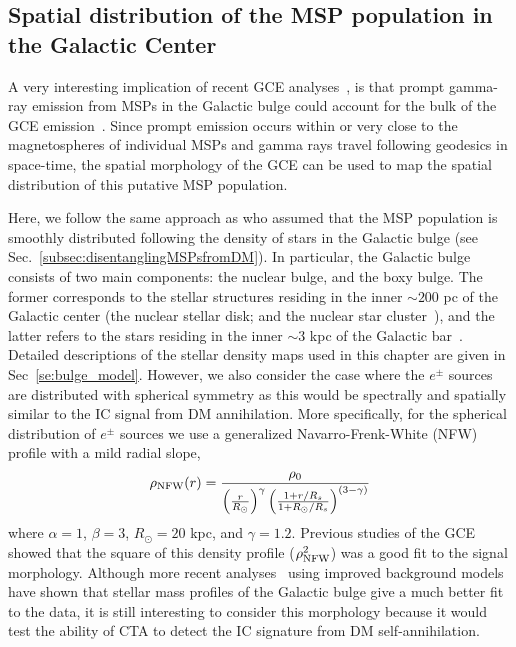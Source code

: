 \documentclass[doublespace,nopageskip]{VTthesis} %
\begin{document}
\subsection{Spatial distribution of the MSP population in the Galactic Center}
\label{subsec:spatialdistribution}

A very interesting implication of recent GCE analyses~\citep{Macias:2016nev,Bartels:2017vsx,Macias:2019omb,Abazajian:2020tww}, is that prompt gamma-ray emission from MSPs in the Galactic bulge could account for the bulk of the GCE emission~\citep{Abazajian:2012pn}. Since 
prompt emission occurs within or very close to the magnetospheres of individual MSPs and
gamma rays travel following geodesics in space-time, the spatial morphology of the GCE can be used to map the spatial distribution of this putative MSP population.

Here, we follow the same approach as \cite{Song:2019nrx} who assumed that the MSP population is smoothly distributed following the density of stars in the Galactic bulge (see Sec.~\ref{subsec:disentanglingMSPsfromDM}). In particular, the Galactic bulge consists of two main components: the nuclear bulge, and the boxy bulge. The former corresponds to the stellar structures residing in the inner $\sim 200$ pc of the Galactic center (the nuclear stellar disk; and the nuclear star cluster~\citealt{Launhardt:2002tx}), and the latter refers to the stars residing in the inner $\sim3$ kpc of the Galactic bar~\citep{Freudenreich:1998,Coleman:2019kax}. Detailed descriptions of the stellar density maps used in this chapter are given in Sec~\ref{se:bulge_model}. However, we also consider the case where the $e^\pm$ sources are distributed with spherical symmetry as this would be spectrally and spatially similar to the IC signal from DM annihilation. More specifically, for the spherical distribution of $e^\pm$ sources we use a generalized Navarro-Frenk-White (NFW) profile with a mild radial slope,
\begin{equation}\label{eq:NFW}
    \rho_{\rm NFW}(r)=\frac{\rho_{0}}{\left(\frac{r}{R_{\odot}}\right)^{\gamma}\left(\frac{1+r / R_{s}}{1+R_{\odot} / R_{s}}\right)^{(3-\gamma)}}
\end{equation}
where $\alpha=1$, $\beta=3$, $R_{\odot}=20$ kpc, and $\gamma=1.2$. Previous studies of the GCE~\citep{Abazajian:2012pn,Gordon:2013vta,Daylan:2014rsa,Calore:2015bsx} showed that the square of this density profile ($\rho^2_{\rm NFW}$)  was a good fit to the signal morphology. Although more recent analyses~\citep{Macias:2016nev,Bartels:2017vsx,Macias:2019omb,Abazajian:2020tww} using improved background models have shown that stellar mass profiles of the Galactic bulge give a much better fit to the data, it is still interesting to consider this morphology because it  would test the ability of CTA to detect the IC signature from DM self-annihilation.
\end{document}
